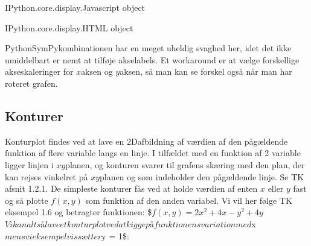 \documentclass[letterpaper,10pt,english]{jupyterBook}
\begin{document}
\begin{sphinxVerbatim}[commandchars=\\\{\}]
\PYGZlt{}IPython.core.display.Javascript object\PYGZgt{}
\end{sphinxVerbatim}

\begin{sphinxVerbatim}[commandchars=\\\{\}]
\PYGZlt{}IPython.core.display.HTML object\PYGZgt{}
\end{sphinxVerbatim}

Python\sphinxhyphen{}SymPy\sphinxhyphen{}kombinationen har en meget uheldig svaghed her, idet det ikke umiddelbart er nemt at tilføje akselabels. Et workaround er at vælge forskellige akseskaleringer for \(x\)\sphinxhyphen{}aksen og \(y\)\sphinxhyphen{}aksen, så man kan se forskel også når man har roteret grafen.


\subsection{Konturer}
\label{\detokenize{notebooks/sympy/Notebook_FlereVar_plot:konturer}}
Konturplot findes ved at lave en 2D\sphinxhyphen{}afbildning af værdien af den pågældende funktion af flere variable langs en linje. I tilfældet med en funktion af 2 variable ligger linjen i \(xy\)\sphinxhyphen{}planen, og konturen svarer til grafens skæring med den plan, der kan rejses vinkelret på \(xy\)\sphinxhyphen{}planen og som indeholder den pågældende linje. Se TK afsnit 1.2.1. De simpleste konturer fås ved at holde værdien af enten \(x\) eller \(y\) fast og så plotte \(f(x,y)\) som funktion af den anden variabel. Vi vil her følge TK eksempel 1.6 og betragter funktionen:
\$\(f(x,y) = 2x^2+ 4x - y^2 + 4y\)\(
Vi kan altså lave et konturplot ved at kigge på funktionens variation med \)x\( mens vi eksempelvis sætter \)y = 1\$:

\begin{sphinxVerbatim}[commandchars=\\\{\}]
   

                  

    
\end{sphinxVerbatim}
\end{document}
